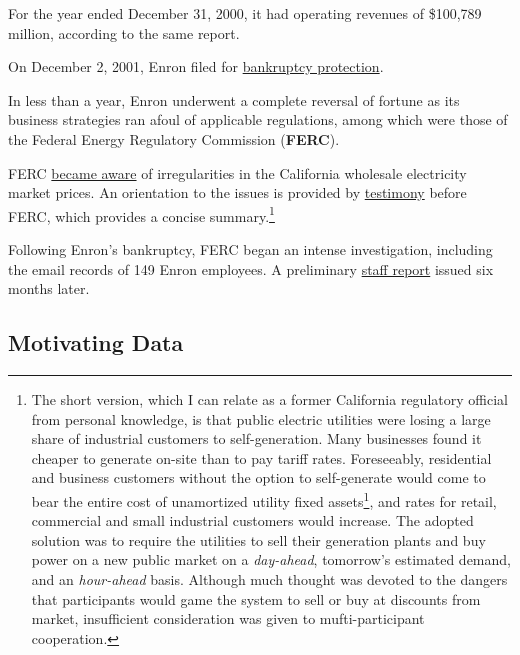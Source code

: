 \documentclass[]{article}
\let\rmarkdownfootnote\footnote%
\def\footnote{\protect\rmarkdownfootnote}
\begin{document}
For the year ended December 31, 2000, it had operating revenues of
\$100,789 million, according to the same report.

On December 2, 2001, Enron filed for
\href{(https://www.sec.gov/Archives/edgar/data/1024401/000102440101500046/ene8-k1214.txt}{bankruptcy
protection}.

In less than a year, Enron underwent a complete reversal of fortune as
its business strategies ran afoul of applicable regulations, among which
were those of the Federal Energy Regulatory Commission (\textbf{FERC}).

FERC
\href{https://www.ferc.gov/industries/electric/indus-act/wec/chron/chronology.pdf}{became
aware} of irregularities in the California wholesale electricity market
prices. An orientation to the issues is provided by
\href{https://web.stanford.edu/group/fwolak/cgi-bin/sites/default/files/files/2002,\%20May\%2015_Senate\%20Committee\%20on\%20Commerce,\%20Science\%20and\%20Transportation_Wolak.pdf}{testimony}
before FERC, which provides a concise summary.\footnote{The short
  version, which I can relate as a former California regulatory official
  from personal knowledge, is that public electric utilities were losing
  a large share of industrial customers to self-generation. Many
  businesses found it cheaper to generate on-site than to pay tariff
  rates. Foreseeably, residential and business customers without the
  option to self-generate would come to bear the entire cost of
  unamortized utility fixed assets\footnote{Termed \emph{stranded costs}},
  and rates for retail, commercial and small industrial customers would
  increase. The adopted solution was to require the utilities to sell
  their generation plants and buy power on a new public market on a
  \emph{day-ahead}, tomorrow's estimated demand, and an
  \emph{hour-ahead} basis. Although much thought was devoted to the
  dangers that participants would game the system to sell or buy at
  discounts from market, insufficient consideration was given to
  mufti-participant cooperation.}

Following Enron's bankruptcy, FERC began an intense investigation,
including the email records of 149 Enron employees. A preliminary
\href{http://elibrary.ferc.gov/idmws/common/opennat.asp?fileID=9548231}{staff
report} issued six months later.

\hypertarget{motivating-data}{%
\subsection{Motivating Data}\label{motivating-data}}
\end{document}
